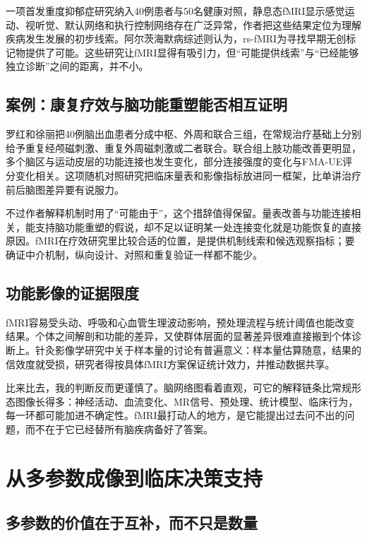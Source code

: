 一项首发重度抑郁症研究纳入40例患者与50名健康对照，静息态fMRI显示感觉运动、视听觉、默认网络和执行控制网络存在广泛异常，作者把这些结果定位为理解疾病发生发展的初步线索\cite{ye2024mdd}。阿尔茨海默病综述则认为，rs-fMRI为寻找早期无创标记物提供了可能\cite{he2024ad}。这些研究让fMRI显得有吸引力，但“可能提供线索”与“已经能够独立诊断”之间的距离，并不小。

\subsection{案例：康复疗效与脑功能重塑能否相互证明}

罗红和徐丽把40例脑出血患者分成中枢、外周和联合三组，在常规治疗基础上分别给予重复经颅磁刺激、重复外周磁刺激或二者联合。联合组上肢功能改善更明显，多个脑区与运动皮层的功能连接也发生变化，部分连接强度的变化与FMA-UE评分变化相关\cite{luo2024rehab}。这项随机对照研究把临床量表和影像指标放进同一框架，比单讲治疗前后脑图差异要有说服力。

不过作者解释机制时用了“可能由于”，这个措辞值得保留。量表改善与功能连接相关，能支持脑功能重塑的假说，却不足以证明某一处连接变化就是功能恢复的直接原因。fMRI在疗效研究里比较合适的位置，是提供机制线索和候选观察指标；要确证中介机制，纵向设计、对照和重复验证一样都不能少。

\subsection{功能影像的证据限度}

fMRI容易受头动、呼吸和心血管生理波动影响，预处理流程与统计阈值也能改变结果。个体之间解剖和功能的差异，又使群体层面的显著差异很难直接搬到个体诊断上。针灸影像学研究中关于样本量的讨论有普遍意义：样本量估算随意，结果的信效度就受损，研究者得按具体fMRI方案保证统计效力，并推动数据共享\cite{zhou2024sample}。

比来比去，我的判断反而更谨慎了。脑网络图看着直观，可它的解释链条比常规形态图像长得多：神经活动、血流变化、MR信号、预处理、统计模型、临床行为，每一环都可能加进不确定性。fMRI最打动人的地方，是它能提出过去问不出的问题，而不在于它已经替所有脑疾病备好了答案。

\section{从多参数成像到临床决策支持}

\subsection{多参数的价值在于互补，而不只是数量}

